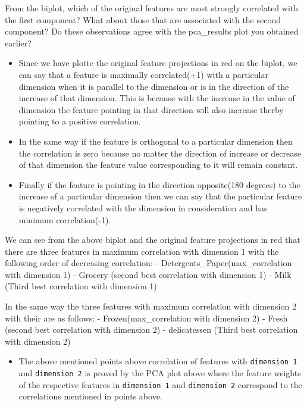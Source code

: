 \documentclass[11pt]{article}
\providecommand{\tightlist}{%
      \setlength{\itemsep}{0pt}\setlength{\parskip}{0pt}}
\begin{document}
From the biplot, which of the original features are most strongly
correlated with the first component? What about those that are
associated with the second component? Do these observations agree with
the pca\_results plot you obtained earlier?

\begin{itemize}
\tightlist
\item
  Since we have plotte the original feature projections in red on the
  biplot, we can say that a feature is maximally correlated(+1) with a
  particular dimension when it is parallel to the dimension or is in the
  direction of the increase of that dimension. This is because with the
  increase in the value of dimension the feature pointing in that
  direction will also increase therby pointing to a positive
  correlation.
\item
  In the same way if the feature is orthogonal to a particular dimension
  then the correlation is zero because no matter the direction of
  increase or decrease of that dimension the feature value corresponding
  to it will remain constsnt.
\item
  Finally if the feature is pointing in the direction opposite(180
  degrees) to the increase of a particular dimension then we can say
  that the particular feature is negatively correlated with the
  dimension in consideration and has minimum correlation(-1).
\end{itemize}

We can see from the above biplot and the original feature projections in
red that there are three features in maximum correlation with dimension
1 with the following order of decreasing correlation: -
Detergents\_Paper(max\_correlation with dimension 1) - Grocery (second
best correlation with dimension 1) - Milk (Third best correlation with
dimension 1)

In the same way the three features with maximum correlation with
dimension 2 with their are as follows: - Frozen(max\_correlation with
dimension 2) - Fresh (second best correlation with dimension 2) -
delicatessen (Third best correlation with dimension 2)

\begin{itemize}
\tightlist
\item
  The above mentioned points above correlation of features with
  \texttt{dimension\ 1} and \texttt{dimension\ 2} is proved by the PCA
  plot above where the feature weights of the respective features in
  \texttt{dimension\ 1} and \texttt{dimension\ 2} correspond to the
  correlations mentioned in points above.
\end{itemize}
\end{document}
